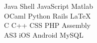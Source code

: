 \documentclass[letterpaper]{deedy-resume} %
\begin{document}
\begin{minipage}[t]{0.33\textwidth}
Java \textbullet{} Shell \textbullet{} JavaScript \textbullet{} Matlab \\
OCaml \textbullet{} Python \textbullet{} Rails \textbullet{} \LaTeX\ \\ 
C \textbullet{} C++ \textbullet{} CSS \textbullet{} PHP \textbullet{} Assembly \\
AS3 \textbullet{} iOS \textbullet{} Android \textbullet{} MySQL

\sectionspace %


\end{minipage} %
\hfill
%
%
\end{document}
